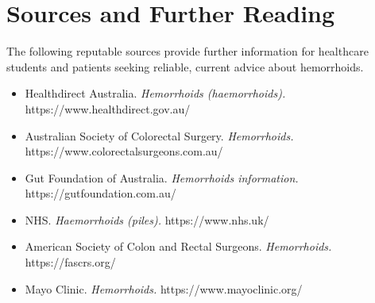 \section*{Sources and Further Reading}
The following reputable sources provide further information for healthcare students and patients seeking reliable, current advice about hemorrhoids.

\begin{itemize}
    \item Healthdirect Australia. \textit{Hemorrhoids (haemorrhoids).} https://www.healthdirect.gov.au/
    \item Australian Society of Colorectal Surgery. \textit{Hemorrhoids.} https://www.colorectalsurgeons.com.au/
    \item Gut Foundation of Australia. \textit{Hemorrhoids information.} https://gutfoundation.com.au/
    \item NHS. \textit{Haemorrhoids (piles).} https://www.nhs.uk/
    \item American Society of Colon and Rectal Surgeons. \textit{Hemorrhoids.} https://fascrs.org/
    \item Mayo Clinic. \textit{Hemorrhoids.} https://www.mayoclinic.org/
\end{itemize}
